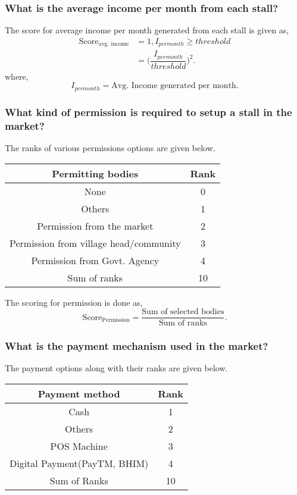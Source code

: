 \documentclass[oneside,twocolumn]{article}
\newcommand{\tsub}[2]{\text{#1}_{\text{#2}}}
\begin{document}
\subsubsection{What is the average income per month from each stall?}
The score for average income per month generated from each stall is given
as,
\begin{align*}
  \tsub{Score}{avg. income} &= 1, I_{per month} \ge threshold \\
  &= \Big(\dfrac{I_{per month}}{threshold}\Big)^{2}.
\end{align*}
where,
\[
I_{per month} = \text{Avg. Income generated per month.}
\]

\subsubsection{What kind of permission is required to setup a stall in the market?}
The ranks of various permissions options are given below.
\begin{center}
  \begin{tabular}{c | c}
    \hline
    Permitting bodies & Rank \\ \hline
    None & 0 \\
    Others & 1 \\
    Permission from the market & 2 \\
    Permission from village head/community & 3 \\
    Permission from Govt. Agency & 4 \\ \hline
    Sum of ranks & 10 \\ \hline
  \end{tabular}
\end{center}

The scoring for permission is done as,
\[
\text{Score}_{\text{Permission}} = \dfrac{\text{Sum of selected bodies}}{\text{Sum of ranks}}.
\]

\subsubsection{What is the payment mechanism used in the market?}
The payment options along with their ranks are given
below.
\begin{center}
  \begin{tabular}{c|c}
    \hline
    Payment method & Rank \\ \hline
    Cash & 1 \\
    Others & 2 \\
    POS Machine & 3 \\
    Digital Payment(PayTM, BHIM) & 4 \\ \hline
    Sum of Ranks & 10 \\ \hline
  \end{tabular}
\end{center}
\end{document}
